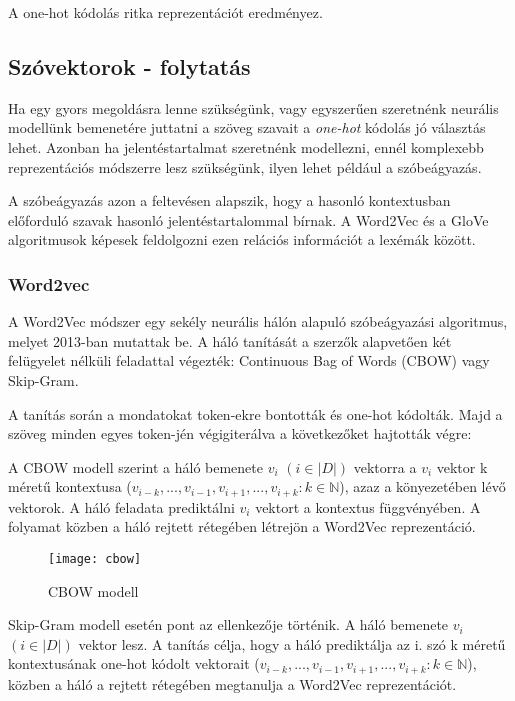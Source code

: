 \begin{note}
	A one-hot kódolás ritka reprezentációt eredményez.
\end{note}

\subsection*{Szóvektorok - folytatás}
Ha egy gyors megoldásra lenne szükségünk, vagy egyszerűen szeretnénk neurális modellünk bemenetére juttatni a szöveg szavait a \textit{one-hot} kódolás jó választás lehet. Azonban ha jelentéstartalmat szeretnénk modellezni, ennél komplexebb reprezentációs módszerre lesz szükségünk, ilyen lehet például a szóbeágyazás.

A szóbeágyazás azon a feltevésen alapszik, hogy a hasonló kontextusban előforduló szavak hasonló jelentéstartalommal bírnak. A Word2Vec és a GloVe algoritmusok képesek feldolgozni ezen relációs információt a lexémák között.

\subsubsection{Word2vec}
A Word2Vec \cite{mikolov2013efficient} módszer egy sekély neurális hálón alapuló szóbeágyazási algoritmus, melyet 2013-ban mutattak be. A háló tanítását a szerzők alapvetően két felügyelet nélküli feladattal végezték: Continuous Bag of Words (CBOW) vagy Skip-Gram.

A tanítás során a mondatokat token-ekre bontották és one-hot kódolták. Majd a szöveg minden egyes token-jén végigiterálva a következőket hajtották végre:

A CBOW modell szerint a háló bemenete $v_i$
$\left( i \in \left|D\right| \right)$ vektorra a $v_i$ vektor k méretű kontextusa ($v_{i-k},...,v_{i-1}, v_{i+1},..., v_{i+k} : k \in \mathbb{N}$), azaz a könyezetében lévő vektorok. A háló feladata prediktálni $v_i$ vektort a kontextus függvényében. A folyamat közben a háló rejtett rétegében létrejön a Word2Vec reprezentáció.

\begin{figure}[H]
	\centering
	\texttt{[image: cbow]}
	\caption{CBOW modell}
\end{figure}

Skip-Gram modell esetén pont az ellenkezője történik. A háló bemenete $v_i$
$\left( i \in \left|D\right| \right)$ vektor lesz. A tanítás célja, hogy a háló prediktálja az i. szó k méretű kontextusának one-hot kódolt vektorait ($v_{i-k},...,v_{i-1}, v_{i+1},..., v_{i+k} : k \in \mathbb{N}$), közben a háló a rejtett rétegében megtanulja a Word2Vec reprezentációt.

